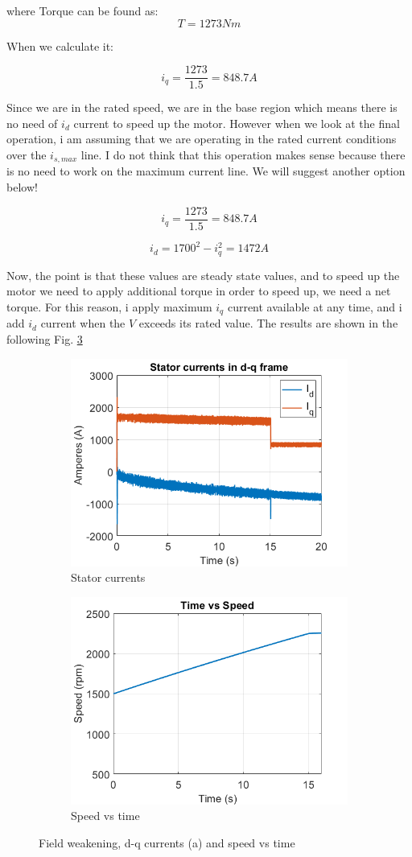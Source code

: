 where Torque can be found as:
$$ T = 1273 Nm$$

When we calculate it:

$$ i_q = \dfrac{1273}{1.5} = 848.7A$$

Since we are in the rated speed, we are in the base region which means there is no need of $i_d$ current to speed up the motor. However when we look at the final operation, i am assuming that we are operating in the rated current conditions over the $i_{s,max}$ line. I do not think that this operation makes sense because there is no need to work on the maximum current line. We will suggest another option below!

$$ i_q = \dfrac{1273}{1.5} = 848.7A$$

$$ i_d = 1700^2 - i_q^2 = 1472A$$

Now, the point is that these values are steady state values, and to speed up the motor we need to apply additional torque in order to speed up, we need a net torque. For this reason, i apply maximum $i_q$ current available at any time, and i add $i_d$ current when the $V$ exceeds its rated value. The results are shown in the following Fig. \ref{fig:b4}


\begin{figure}[H]
        \centering
        \begin{subfigure}[b]{0.475\textwidth}
            \centering
            \includegraphics[width = 8 cm]{figs/b4_dq.png}
            \caption{Stator currents}
            \label{fig:b4_dq}
        \end{subfigure}
        \hfill
        \begin{subfigure}[b]{0.475\textwidth}  
            \centering 
            \includegraphics[width = 8 cm]{figs/b4_speed.png}
            \caption{Speed vs time}
            \label{fig:b4_speed}
        \end{subfigure}
        \caption{Field weakening, d-q currents (a) and speed vs time}
        \label{fig:b4}
        \end{figure}    
        
